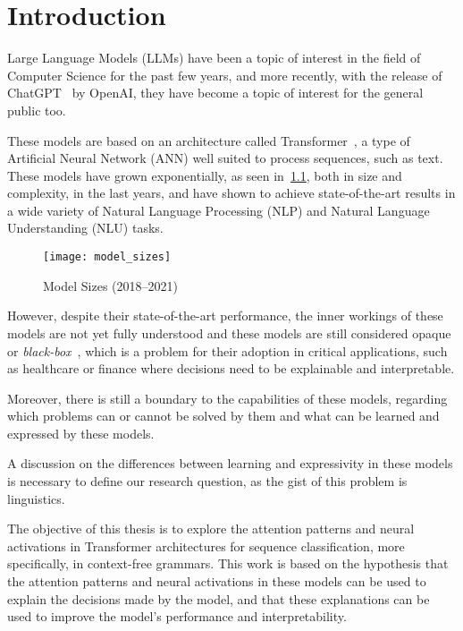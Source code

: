 \chapter{Introduction}

Large Language Models (LLMs) have been a topic of interest in the field of Computer Science for the past few years, 
and more recently, with the release of ChatGPT~\cite{chatgpt} by OpenAI, they have become a topic of interest for the general public too.

These models are based on an architecture called Transformer~\cite{attention_is_all_you_need}, a type of Artificial Neural Network (ANN) 
well suited to process sequences, such as text. These models have grown exponentially, as seen in~\ref{fig:model_sizes}, both in size and complexity, in the last years, and 
have shown to achieve state-of-the-art results in a wide variety of Natural Language Processing (NLP) and Natural Language Understanding (NLU) tasks.

\begin{figure}[H]
    \centering
    \texttt{[image: model\_sizes]}
    \caption{Model Sizes (2018--2021)~\cite{model_sizes}}
    \label{fig:model_sizes}
\end{figure}

However, despite their state-of-the-art performance, the inner workings of these models are not yet fully understood and these models are still considered opaque or \emph{black-box}~\cite{lei-etal-2016-rationalizing}, which is a problem for their adoption in critical applications, such as healthcare or finance 
where decisions need to be explainable and interpretable. 

Moreover, there is still a boundary to the capabilities of these models, regarding which problems can or cannot be solved by them and what can be learned and expressed by these models.

A discussion on the differences between learning and expressivity in these models is necessary to define our research question, as the gist of this problem is linguistics.

The objective of this thesis is to explore the attention patterns and neural activations in Transformer architectures for sequence classification, more specifically, in context-free grammars.
This work is based on the hypothesis that the attention patterns and neural activations in these models can be used to explain the decisions made by the model, and that these explanations can be used to improve the model's performance and interpretability.


